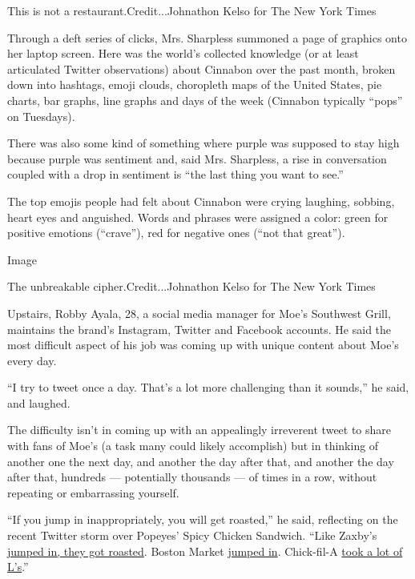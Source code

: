 This is not a restaurant.Credit...Johnathon Kelso for The New York Times

Through a deft series of clicks, Mrs. Sharpless summoned a page of
graphics onto her laptop screen. Here was the world's collected
knowledge (or at least articulated Twitter observations) about Cinnabon
over the past month, broken down into hashtags, emoji clouds, choropleth
maps of the United States, pie charts, bar graphs, line graphs and days
of the week (Cinnabon typically ``pops'' on Tuesdays).

There was also some kind of something where purple was supposed to stay
high because purple was sentiment and, said Mrs. Sharpless, a rise in
conversation coupled with a drop in sentiment is ``the last thing you
want to see.''

The top emojis people had felt about Cinnabon were crying laughing,
sobbing, heart eyes and anguished. Words and phrases were assigned a
color: green for positive emotions (``crave''), red for negative ones
(``not that great'').

Image

The unbreakable cipher.Credit...Johnathon Kelso for The New York Times

Upstairs, Robby Ayala, 28, a social media manager for Moe's Southwest
Grill, maintains the brand's Instagram, Twitter and Facebook accounts.
He said the most difficult aspect of his job was coming up with unique
content about Moe's every day.

``I try to tweet once a day. That's a lot more challenging than it
sounds,'' he said, and laughed.

The difficulty isn't in coming up with an appealingly irreverent tweet
to share with fans of Moe's (a task many could likely accomplish) but in
thinking of another one the next day, and another the day after that,
and another the day after that, hundreds --- potentially thousands ---
of times in a row, without repeating or embarrassing yourself.

``If you jump in inappropriately, you will get roasted,'' he said,
reflecting on the recent Twitter storm over Popeyes' Spicy Chicken
Sandwich. ``Like Zaxby's
\href{https://twitter.com/Zaxbys/status/1163608537056063490}{jumped in,
they got roasted}. Boston Market
\href{https://twitter.com/bostonmarket/status/1163520399562498054}{jumped
in}. Chick-fil-A
\href{https://twitter.com/PopeyesChicken/status/1163510538959069184?ref_src=twsrc\%5Etfw\%7Ctwcamp\%5Etweetembed\%7Ctwterm\%5E1163510538959069184\&ref_url=https\%3A\%2F\%2Fwww.vox.com\%2Fthe-goods\%2F2019\%2F8\%2F28\%2F20836936\%2Fpopeyes-chick-fil-a-fried-chicken-sandwich-twitter}{took
a lot of L's}.''

